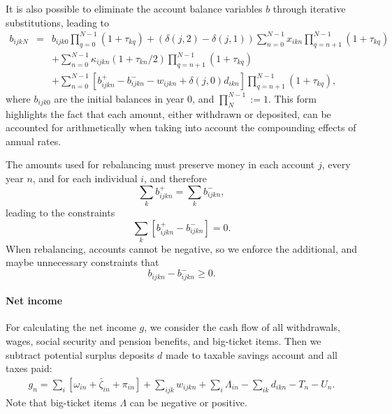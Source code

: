\documentclass{article}[fleqn,12pt]
\begin{document}
	It is also possible to eliminate the account balance variables $b$ through iterative
	substitutions, leading to
	\begin{eqnarray}
		\label{Eq:C3c}
		b_{ijkN} &=& b_{ijk0}\prod_{q=0}^{N-1} (1 + \tau_{kq})
		+ (\delta(j, 2) - \delta(j, 1)) \sum_{n=0}^{N-1} 
		x_{ikn} \prod_{q=n+1}^{N-1} (1 + \tau_{kq})
		\nonumber \\
		&&+ \sum_{n=0}^{N-1} \kappa_{ijkn}(1 + \tau_{kn}/2)\prod_{q=n+1}^{N-1} (1 + \tau_{kq})
		\nonumber \\
		&& + \sum_{n=0}^{N-1} [ b^+_{ijkn} - b^-_{ijkn} - w_{ijkn} + \delta(j, 0) d_{ikn}]
		\prod_{q=n+1}^{N-1} (1 + \tau_{kq}),
	\end{eqnarray}
	where $b_{ijk0}$ are the initial balances in year 0, and $\prod_{N}^{N-1} := 1$. This form
	highlights the fact that each amount, either withdrawn or deposited, can be accounted
	for arithmetically when taking into account the compounding effects of annual rates.

	The amounts used for rebalancing must preserve money in each account $j$, every year $n$,
	and for each individual $i$, and therefore
	\begin{equation}
		\sum_k b^+_{ijkn} = \sum _k b^-_{ijkn},
	\end{equation}
	leading to the constraints
	\begin{equation}
		\label{Eq:NoNewMoney}
		\sum_k [b^+_{ijkn} - b^-_{ijkn}] = 0.
	\end{equation}
	When rebalancing, accounts cannot be negative, so we enforce the additional, and maybe
	unnecessary constraints that
	\begin{equation}
		\label{Eq:EnoughMoney}
		b_{ijkn} - b^-_{ijkn} \geq 0.
	\end{equation}

\paragraph*{Net income}
	For calculating the net income $g$, we consider the cash flow of all withdrawals,
	wages, social security and pension benefits, and big-ticket items. 
	Then we subtract potential surplus deposits $d$ made to taxable savings account
	and all taxes paid:
	\begin{eqnarray}
		g_n = \sum_i [\omega_{in} + \bar{\zeta}_{in} + \pi_{in} ] 
		+ \sum_{ijk} w_{ijkn} + \sum_i \Lambda_{in} - \sum_{ik}d_{ikn}
		- T_n - U_n.
	\end{eqnarray}
	Note that big-ticket items $\Lambda$ can be negative or positive.
\end{document}
